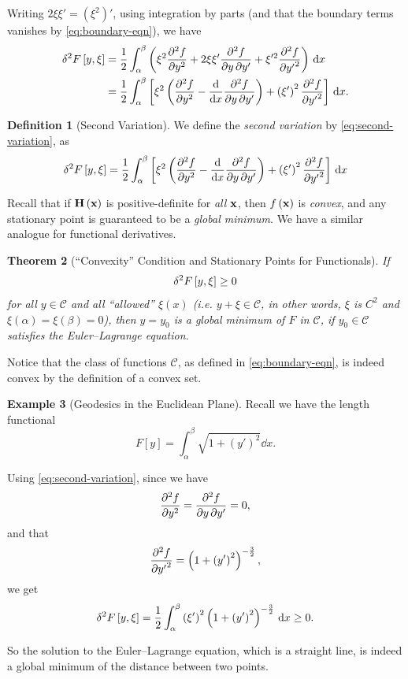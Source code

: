 \documentclass[11pt]{article}
\numberwithin{equation}{section}
\newtheorem{theorem}{Theorem}[section]
\theoremstyle{definition}
\newtheorem{definition}[theorem]{Definition}
\newtheorem{example}[theorem]{Example}
\theoremstyle{remark}
\newcommand{\pqty}[1]{\left(#1\right)}
\newcommand{\bqty}[1]{\left[#1\right]}
\newcommand{\flatfrac}[2]{\frac{#1}{#2}}
\newcommand{\contClass}[1]{C^{#1}}
\newcommand{\contClassSymb}{\mathcal{C}}
\begin{document}
Writing \(2 \xi \xi' = \pqty{\xi^2}'\), using integration by parts (and that the boundary terms vanishes by \autoref{eq:boundary-eqn}), we have
\begin{equation}
    \label{eq:second-variation}%
    \begin{aligned}
        \var[2]{F\bqty{y, \xi}} &= \frac{1}{2} \int_{\alpha}^{\beta} \pqty{\xi^2 \pdv[2]{f}{y} + 2 \xi \xi' \pdv{f}{y}{y'} + \xi'^2 \pdv[2]{f}{{y'}}} \dd{x} \\
        &= \frac{1}{2} \int_{\alpha}^{\beta} \bqty{\xi^2 \pqty{\pdv[2]{f}{y} - \dv{x} \pdv{f}{y}{y'}} + \pqty{\xi'}^2 \pdv[2]{f}{{y'}}} \dd{x}.
    \end{aligned}
\end{equation}

\begin{definition}[Second Variation]\label{variation-unit-0089}
    We define the \emph{second variation} by \autoref{eq:second-variation}, as
    \[
        \var[2]{F\bqty{y, \xi}} = \frac{1}{2} \int_{\alpha}^{\beta} \bqty{\xi^2 \pqty{\pdv[2]{f}{y} - \dv{x} \pdv{f}{y}{y'}} + \pqty{\xi'}^2 \pdv[2]{f}{{y'}}} \dd{x}
    \]
\end{definition}

Recall that if \(\vb{H} \pqty{\vb{x}}\) is positive-definite for \emph{all} \(\vb{x}\), then \(f\pqty{\vb{x}}\) is \emph{convex}, and any stationary point is guaranteed to be a \emph{global minimum}. We have a similar analogue for functional derivatives.

\begin{theorem}[``Convexity'' Condition and Stationary Points for Functionals]\label{variation-unit-0090}
    If
    \[
        \var[2]{F\bqty{y, \xi}} \geq 0
    \]
    for \emph{all} \(y \in \contClassSymb\) and all ``allowed'' \(\xi\pqty{x}\) (i.e. \(y + \xi \in \contClassSymb\), in other words, \(\xi\) is \(\contClass{2}\) and \(\xi\pqty{\alpha} = \xi\pqty{\beta} = 0\)), then \(y = y_0\) is a global minimum of \(F\) in \(\contClassSymb\), if \(y_0 \in \contClassSymb\) satisfies the Euler--Lagrange equation.
\end{theorem}

Notice that the class of functions \(\contClassSymb\), as defined in \autoref{eq:boundary-eqn}, is indeed convex by the definition of a convex set.

\begin{example}[Geodesics in the Euclidean Plane]\label{variation-unit-0091}
    Recall we have the length functional
    \[
        F\bqty{y} = \int_{\alpha}^{\beta} \sqrt{1 + \pqty{y'}^2} \dd{x}.
    \]

    Using \autoref{eq:second-variation}, since we have
    \[
        \pdv[2]{f}{y} = \pdv{f}{y}{y'} = 0,
    \]
    and that
    \[
        \pdv[2]{f}{{y'}} = \pqty{1 + \pqty{y'}^2}^{- \flatfrac{3}{2}},
    \]
    we get
    \[
        \var[2]{F\bqty{y, \xi}} = \frac{1}{2} \int_{\alpha}^{\beta} \pqty{\xi'}^2 \pqty{1 + \pqty{y'}^2}^{- \flatfrac{3}{2}} \dd{x} \geq 0.
    \]

    So the solution to the Euler--Lagrange equation, which is a straight line, is indeed a global minimum of the distance between two points.
\end{example}
\end{document}
